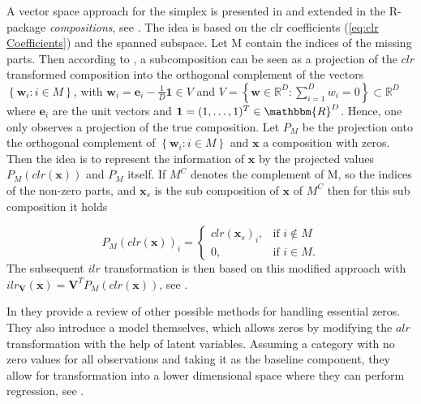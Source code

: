 A vector space approach for the simplex is presented in \textcite{Boogaart:2006} and extended in the R-package \textit{compositions}, see \textcite{Compositions:2023}. The idea is based on the clr coefficients (\ref{eq:clr Coefficients}) and the spanned subspace. Let M contain the indices of the missing parts. Then according to \textcite{Egozcue:2005}, a subcomposition can be seen as a projection of the $clr$ transformed composition into the orthogonal complement of the vectors $\left\{\bm{w}_i: i \in M\right\}$, with $\bm{w}_i = \bm{e}_i - \frac{1}{D}\bm{1} \in V$ and $V = \left\{\textbf{w} \in \mathbb{R}^D: \sum_{i=1}^D w_i=0\right\} \subset \mathbb{R}^D$ where $\bm{e}_i$ are the unit vectors and $\bm{1}=(1,\ldots,1)^T \in \mathbbm{R}^D$. Hence, one only observes a projection of the true composition. Let $P_M$ be the projection onto the orthogonal complement of $\left\{\bm{w}_i: i \in M\right\}$ and $\bm{x}$ a composition with zeros. Then the idea is to represent the information of $\bm{x}$ by the projected values $P_M(clr(\bm{x}))$ and $P_M$ itself. If $M^C$ denotes the complement of M, so the indices of the non-zero parts, and $\bm{x}_s$ is the sub composition of $\bm{x}$ of $M^C$ then for this sub composition it holds 

\begin{equation}
P_M(clr(\bm{x}))_i =
\begin{cases}
clr(\bm{x}_s)_i, & \text{if } i \notin M \\
0, & \text{if } i \in M.
\end{cases}
\label{eq:clr Projection}
\end{equation}
%
The subsequent $ilr$ transformation is then based on this modified approach with $ ilr_{\textbf{V}}(\textbf{x}) = \textbf{V}^T P_M(clr(\textbf{x}))$, see \textcite{Compositions:2023}.

In \textcite{Leininger:2013} they provide a review of other possible methods for handling essential zeros. They also introduce a model themselves, which allows zeros by modifying the $alr$ transformation with the help of latent variables. Assuming a category with no zero values for all observations and taking it as the baseline component, they allow for transformation into a lower dimensional space where they can perform regression, see \textcite{Leininger:2013}.

